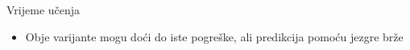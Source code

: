 \documentclass[12pt]{beamer}
\begin{document}
  \begin{frame}{Vrijeme učenja}
    \begin{itemize}
    \item Obje varijante mogu doći do iste pogreške, ali predikcija pomoću jezgre brže
    \end{itemize}

    \begin{center}
    \end{center}
  \end{frame}
\end{document}

